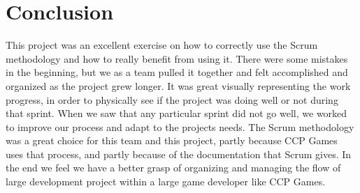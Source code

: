\section{Conclusion}\label{sec:conclusion}
This project was an excellent exercise on how to correctly use the Scrum methodology and how to really benefit from using it. There were some mistakes in the beginning, but we as a team pulled it together and felt accomplished and organized as the project grew longer. It was great visually representing the work progress, in order to physically see if the project was doing well or not during that sprint. When we saw that any particular sprint did not go well, we worked to improve our process and adapt to the projects needs. The Scrum methodology was a great choice for this team and this project, partly because CCP Games uses that process, and partly because of the documentation that Scrum gives. In the end we feel we have a better grasp of organizing and managing the flow of large development project within a large game developer like CCP Games.